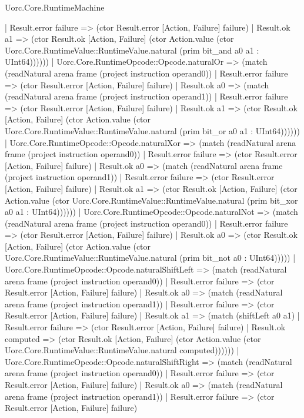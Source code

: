 \begin{lexlean}{Uorc.Core.RuntimeMachine}
\begin{semanticmodule}
{        | Result.error failure => (ctor Result.error [Action, Failure] failure)
        | Result.ok a1 => (ctor Result.ok [Action, Failure] (ctor Action.value (ctor Uorc.Core.RuntimeValue::RuntimeValue.natural (prim bit_and a0 a1 : UInt64))))))
    | Uorc.Core.RuntimeOpcode::Opcode.naturalOr => (match (readNatural arena frame (project instruction operand0))
      | Result.error failure => (ctor Result.error [Action, Failure] failure)
      | Result.ok a0 => (match (readNatural arena frame (project instruction operand1))
        | Result.error failure => (ctor Result.error [Action, Failure] failure)
        | Result.ok a1 => (ctor Result.ok [Action, Failure] (ctor Action.value (ctor Uorc.Core.RuntimeValue::RuntimeValue.natural (prim bit_or a0 a1 : UInt64))))))
    | Uorc.Core.RuntimeOpcode::Opcode.naturalXor => (match (readNatural arena frame (project instruction operand0))
      | Result.error failure => (ctor Result.error [Action, Failure] failure)
      | Result.ok a0 => (match (readNatural arena frame (project instruction operand1))
        | Result.error failure => (ctor Result.error [Action, Failure] failure)
        | Result.ok a1 => (ctor Result.ok [Action, Failure] (ctor Action.value (ctor Uorc.Core.RuntimeValue::RuntimeValue.natural (prim bit_xor a0 a1 : UInt64))))))
    | Uorc.Core.RuntimeOpcode::Opcode.naturalNot => (match (readNatural arena frame (project instruction operand0))
      | Result.error failure => (ctor Result.error [Action, Failure] failure)
      | Result.ok a0 => (ctor Result.ok [Action, Failure] (ctor Action.value (ctor Uorc.Core.RuntimeValue::RuntimeValue.natural (prim bit_not a0 : UInt64)))))
    | Uorc.Core.RuntimeOpcode::Opcode.naturalShiftLeft => (match (readNatural arena frame (project instruction operand0))
      | Result.error failure => (ctor Result.error [Action, Failure] failure)
      | Result.ok a0 => (match (readNatural arena frame (project instruction operand1))
        | Result.error failure => (ctor Result.error [Action, Failure] failure)
        | Result.ok a1 => (match (shiftLeft a0 a1)
          | Result.error failure => (ctor Result.error [Action, Failure] failure)
          | Result.ok computed => (ctor Result.ok [Action, Failure] (ctor Action.value (ctor Uorc.Core.RuntimeValue::RuntimeValue.natural computed))))))
    | Uorc.Core.RuntimeOpcode::Opcode.naturalShiftRight => (match (readNatural arena frame (project instruction operand0))
      | Result.error failure => (ctor Result.error [Action, Failure] failure)
      | Result.ok a0 => (match (readNatural arena frame (project instruction operand1))
        | Result.error failure => (ctor Result.error [Action, Failure] failure)
}
\end{semanticmodule}
\end{lexlean}
